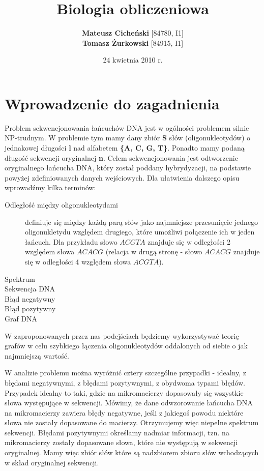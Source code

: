 \documentclass[a4paper,10pt]{article}
\title{\textbf{Biologia obliczeniowa}}
\author{\textbf{Mateusz Cicheński} [84780, I1]\\ \textbf{Tomasz Żurkowski} [84915, I1]}
\date{24 kwietnia 2010 r.}
\begin{document}
 
\maketitle

\tableofcontents

\newpage

\section{Wprowadzenie do zagadnienia}

Problem sekwencjonowania łańcuchów DNA jest w ogólności problemem silnie NP-trudnym. W problemie tym mamy dany zbiór {\bf S} słów (oligonukleotydów) o jednakowej długości {\bf l} nad alfabetem {\bf \{A, C, G, T\}}. Ponadto mamy podaną długość sekwencji oryginalnej {\bf n}. Celem sekwencjonowania jest odtworzenie oryginalnego łańcucha DNA, który został poddany hybrydyzacji, na podstawie powyżej zdefiniowanych danych wejściowych.
Dla ułatwienia dalszego opisu wprowadźmy kilka terminów: 
\begin{description}
  \item[Odległość między oligonukleotydami] definiuje się między każdą parą słów jako najmniejsze przesunięcie jednego oligonukletydu względem drugiego, które umożliwi połączenie ich w jeden łańcuch. Dla przykładu słowo $ACGTA$ znajduje się w odległości 2 względem słowa $ACACG$ (relacja w drugą stronę - słowo $ACACG$ znajduje się w odległości 4 względem słowa $ACGTA$).

  \item[Spektrum] %
  \item[Sekwencja DNA] %
  \item[Błąd negatywny]
  \item[Błąd pozytywny] 
  \item[Graf DNA]
\end{description}
W zaproponowanych przez nas podejściach będziemy wykorzystywać teorię grafów w celu szybkiego łączenia oligonukleotydów oddalonych od siebie o jak najmniejszą wartość.

W analizie problemu można wyróżnić cztery szczególne przypadki - idealny, z błędami negatywnymi, z błędami pozytywnymi, z obydwoma typami błędów.
Przypadek idealny to taki, gdzie na mikromacierzy dopasowały się wszystkie słowa występujące w sekwencji.
Mówimy, że dane odwzorowanie łańcucha DNA na mikromacierzy zawiera błędy negatywne, jeśli z jakiegoś powodu niektóre słowa nie zostały dopasowane do macierzy. Otrzymujemy więc niepełne spektrum sekwencji.
Błędami pozytywnymi określamy nadmiar informacji, tzn. na mikromacierzy zostały dopasowane słowa, które nie występują w sekwencji oryginalnej. Mamy więc zbiór słów które są nadzbiorem zbioru słów wchodzących w skład oryginalnej sekwencji.
\end{document}

